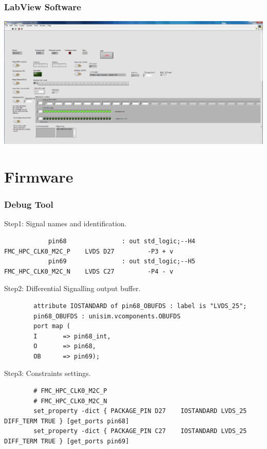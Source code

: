 \documentclass[aspectratio=169]{beamer}
\begin{document}
	\begin{frame}
	\frametitle{LabView Software}
	\begin{center}
		\includegraphics[width=0.8 \textwidth]{IMG/LabVIEWBaselineDac.PNG}
	\end{center}
	
	\end{frame}

	
	\section{Firmware}
	
	\begin{frame}[fragile]
	\frametitle{Debug Tool}
	\begin{center}
		{\small \color{blue} Step1: Signal names and identification.}
	\end{center}
	{\tiny
		\begin{verbatim}
			pin68				: out std_logic;--H4  FMC_HPC_CLK0_M2C_P    LVDS D27         -P3 + v
			pin69				: out std_logic;--H5  FMC_HPC_CLK0_M2C_N    LVDS C27         -P4 - v 
		\end{verbatim} }
	\begin{center}
		{\small \color{blue} Step2: Differential Signalling output buffer.}
	\end{center}
	{\tiny
		\begin{verbatim}
		attribute IOSTANDARD of pin68_OBUFDS : label is "LVDS_25";	
		pin68_OBUFDS : unisim.vcomponents.OBUFDS
		port map (
		I		=> pin68_int,
		O		=> pin68,
		OB		=> pin69);		
		\end{verbatim} }
	\begin{center}
		{\small \color{blue} Step3: Constraints settings.}
	\end{center}
	{\tiny
		\begin{verbatim}
		# FMC_HPC_CLK0_M2C_P
		# FMC_HPC_CLK0_M2C_N
		set_property -dict { PACKAGE_PIN D27	IOSTANDARD LVDS_25 DIFF_TERM TRUE }	[get_ports pin68]
		set_property -dict { PACKAGE_PIN C27	IOSTANDARD LVDS_25 DIFF_TERM TRUE }	[get_ports pin69]
		\end{verbatim} }
	\end{frame}
\end{document}
